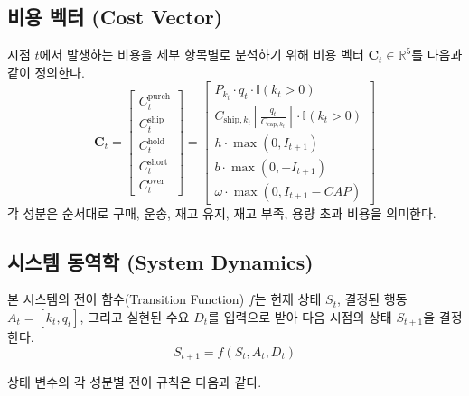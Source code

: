 \documentclass[a4paper, 11pt]{article}
\begin{document}
\subsection{비용 벡터 (Cost Vector)}
시점 $t$에서 발생하는 비용을 세부 항목별로 분석하기 위해 비용 벡터 $\mathbf{C}_t \in \mathbb{R}^5$를 다음과 같이 정의한다.
\begin{equation}
    \mathbf{C}_t = 
    \begin{bmatrix}
    C^{\text{purch}}_t \\ C^{\text{ship}}_t \\ C^{\text{hold}}_t \\ C^{\text{short}}_t \\ C^{\text{over}}_t
    \end{bmatrix}
    =
    \begin{bmatrix}
    P_{k_t} \cdot q_t \cdot \mathbb{I}(k_t > 0) \\
    C_{\text{ship}, k_t} \left\lceil \frac{q_t}{C_{\text{cap}, k_t}} \right\rceil \cdot \mathbb{I}(k_t > 0) \\
    h \cdot \max(0, I_{t+1}) \\
    b \cdot \max(0, -I_{t+1}) \\
    \omega \cdot \max(0, I_{t+1} - CAP)
    \end{bmatrix}
\end{equation}
각 성분은 순서대로 구매, 운송, 재고 유지, 재고 부족, 용량 초과 비용을 의미한다.
\clearpage %

\subsection{시스템 동역학 (System Dynamics)}
본 시스템의 전이 함수(Transition Function) $f$는 현재 상태 $S_t$, 결정된 행동 $A_t = [k_t, q_t]$, 그리고 실현된 수요 $D_t$를 입력으로 받아 다음 시점의 상태 $S_{t+1}$을 결정한다.
\begin{equation}
    S_{t+1} = f(S_t, A_t, D_t)
\end{equation}

상태 변수의 각 성분별 전이 규칙은 다음과 같다.
\end{document}
